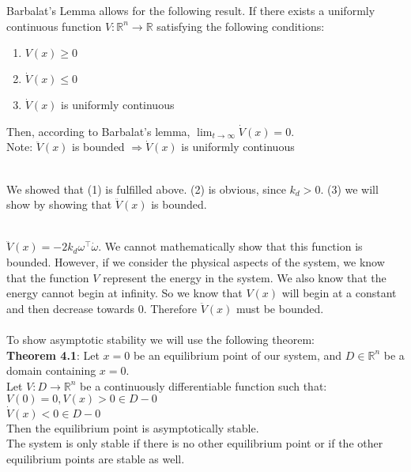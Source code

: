 Barbalat's Lemma allows for the following result. If there exists a uniformly continuous function $V: \mathbb{R}^n \rightarrow \mathbb{R}$ satisfying the following conditions:

\begin{enumerate}  
\item $V(x) \geq 0$
\item $\dot V(x) \leq 0$
\item $\dot V(x)$ is uniformly continuous 
\end{enumerate}

Then, according to Barbalat's lemma, $\lim_{t \rightarrow \infty} \dot V(x) = 0$. \\
Note: $\ddot V(x)$ is bounded $\Rightarrow \dot{V}(x)$ is uniformly continuous

\\We showed that (1) is fulfilled above. (2) is obvious, since $k_d > 0$. (3) we will show by showing that $\ddot V(x)$ is bounded.

\\ $\ddot V(x) = -2k_d \omega^\top \dot \omega$. We cannot mathematically show that this function is bounded. However, if we consider the physical aspects of the system, we know that the function $V$ represent the energy in the system. We also know that the energy cannot begin at infinity. So we know that $V(x)$ will begin at a constant and then decrease towards $0$. Therefore $\ddot V(x)$ must be  bounded.
\\ \\ To show asymptotic stability we will use the following theorem: \\
\textbf{Theorem 4.1}: Let $x = 0$ be an equilibrium point of our system, and $D \in \mathbb{R}^n$ be a domain containing $x = 0$. \\
Let $V: D \rightarrow \mathbb{R}^n$ be a continuously differentiable function such that: \\
$V(0) = 0,  V(x) > 0 \in D - {0}$\\
$\dot V(x) < 0 \in D - {0}$\\
Then the equilibrium point is asymptotically stable.
\\ The system is only stable if there is no other equilibrium point or if the other equilibrium points are stable as well.